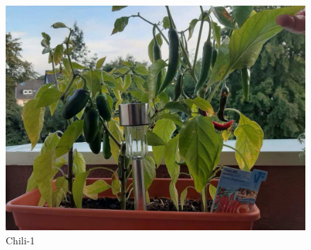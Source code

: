 %
%
%
\begin{figure}[!hb]%
    \centering
  \includegraphics[width=.80\textwidth]{images/Chili-1.pdf}%
  \caption{Chili-1}%
\end{figure}

